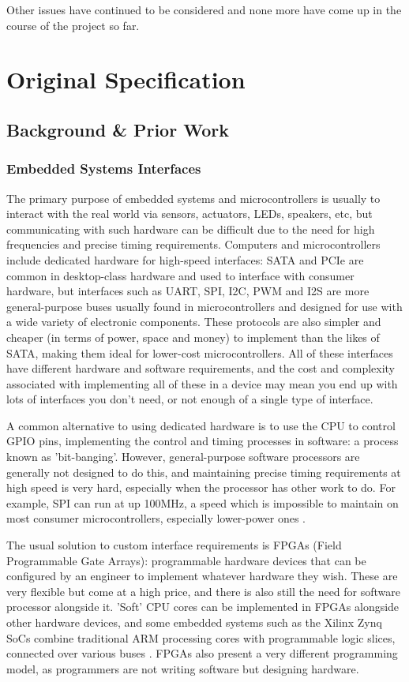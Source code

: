\documentclass[a4paper,fleqn,12pt]{article}
\begin{document}
Other issues have continued to be considered and none more have come up in the course of the project so far.

\appendix
\section{Original Specification}

\subsection{Background \& Prior Work}

\subsubsection{Embedded Systems Interfaces}

The primary purpose of embedded systems and microcontrollers is usually to interact with the real world via sensors, actuators, LEDs, speakers, etc, but communicating with such hardware can be difficult due to the need for high frequencies and precise timing requirements. Computers and microcontrollers include dedicated hardware for high-speed interfaces: SATA and PCIe are common in desktop-class hardware and used to interface with consumer hardware, but interfaces such as UART, SPI, I2C, PWM and I2S are more general-purpose buses usually found in microcontrollers and designed for use with a wide variety of electronic components. These protocols are also simpler and cheaper (in terms of power, space and money) to implement than the likes of SATA, making them ideal for lower-cost microcontrollers. All of these interfaces have different hardware and software requirements, and the cost and complexity associated with implementing all of these in a device may mean you end up with lots of interfaces you don't need, or not enough of a single type of interface.

A common alternative to using dedicated hardware is to use the CPU to control GPIO pins, implementing the control and timing processes in software: a process known as 'bit-banging'. However, general-purpose software processors are generally not designed to do this, and maintaining precise timing requirements at high speed is very hard, especially when the processor has other work to do. For example, SPI can run at up 100MHz, a speed which is impossible to maintain on most consumer microcontrollers, especially lower-power ones \citep{picosdk}.

The usual solution to custom interface requirements is FPGAs (Field Programmable Gate Arrays): programmable hardware devices that can be configured by an engineer to implement whatever hardware they wish. These are very flexible but come at a high price, and there is also still the need for software processor alongside it. 'Soft' CPU cores can be implemented in FPGAs alongside other hardware devices, and some embedded systems such as the Xilinx Zynq SoCs combine traditional ARM processing cores with programmable logic slices, connected over various buses \citep{zynq}. FPGAs also present a very different programming model, as programmers are not writing software but designing hardware.
\end{document}
